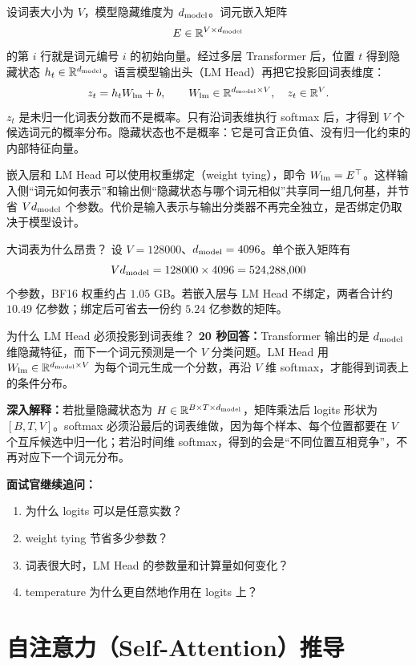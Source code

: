 设词表大小为 $V$，模型隐藏维度为 $d_{\rm model}$。词元嵌入矩阵
\[
E\in\mathbb R^{V\times d_{\rm model}}
\]
的第 $i$ 行就是词元编号 $i$ 的初始向量。经过多层 Transformer 后，位置 $t$ 得到隐藏状态 $h_t\in\mathbb R^{d_{\rm model}}$。语言模型输出头（LM Head）再把它投影回词表维度：
\[
z_t=h_tW_{\rm lm}+b,\qquad
W_{\rm lm}\in\mathbb R^{d_{\rm model}\times V},\quad
z_t\in\mathbb R^V.
\]
$z_t$ 是未归一化词表分数而不是概率。只有沿词表维执行 softmax 后，才得到 $V$ 个候选词元的概率分布。隐藏状态也不是概率：它是可含正负值、没有归一化约束的内部特征向量。

嵌入层和 LM Head 可以使用权重绑定（weight tying），即令 $W_{\rm lm}=E^\top$。这样输入侧“词元如何表示”和输出侧“隐藏状态与哪个词元相似”共享同一组几何基，并节省 $Vd_{\rm model}$ 个参数。代价是输入表示与输出分类器不再完全独立，是否绑定仍取决于模型设计。

\begin{exercisebox}{大词表为什么昂贵？}
设 $V=128000$、$d_{\rm model}=4096$。单个嵌入矩阵有
\[
Vd_{\rm model}=128000\times4096=524{,}288{,}000
\]
个参数，BF16 权重约占 $1.05$ GB。若嵌入层与 LM Head 不绑定，两者合计约 $10.49$ 亿参数；绑定后可省去一份约 $5.24$ 亿参数的矩阵。
\end{exercisebox}

\begin{interviewbox}{为什么 LM Head 必须投影到词表维？}
\textbf{20 秒回答：}Transformer 输出的是 $d_{\rm model}$ 维隐藏特征，而下一个词元预测是一个 $V$ 分类问题。LM Head 用 $W_{\rm lm}\in\mathbb R^{d_{\rm model}\times V}$ 为每个词元生成一个分数，再沿 $V$ 维 softmax，才能得到词表上的条件分布。

\textbf{深入解释：}若批量隐藏状态为 $H\in\mathbb R^{B\times T\times d_{\rm model}}$，矩阵乘法后 logits 形状为 $[B,T,V]$。softmax 必须沿最后的词表维做，因为每个样本、每个位置都要在 $V$ 个互斥候选中归一化；若沿时间维 softmax，得到的会是“不同位置互相竞争”，不再对应下一个词元分布。

\textbf{面试官继续追问：}
\begin{enumerate}
  \item 为什么 logits 可以是任意实数？
  \item weight tying 节省多少参数？
  \item 词表很大时，LM Head 的参数量和计算量如何变化？
  \item temperature 为什么更自然地作用在 logits 上？
\end{enumerate}
\end{interviewbox}

\section{自注意力（Self-Attention）推导}
\label{sec:attention}

